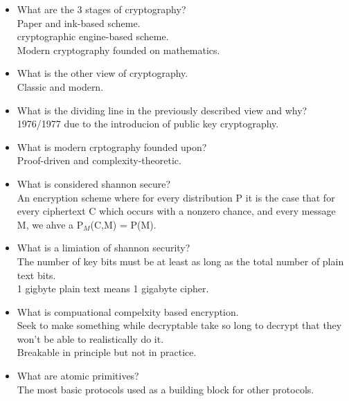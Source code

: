 \begin{itemize}
    \item What are the 3 stages of cryptography?\\
          Paper and ink-based scheme.\\
          cryptographic engine-based scheme.\\
          Modern cryptography founded on mathematics.\\

    \item What is the other view of cryptography.\\
          Classic and modern.\\

    \item What is the dividing line in the previously described view and why?\\
          1976/1977 due to the introducion of public key cryptography.\\

    \item What is modern crptography founded upon?\\
          Proof-driven and complexity-theoretic.\\

    \item What is considered shannon secure?\\
          An encryption scheme where for every distribution P it is the case that for every ciphertext C
          which occurs with a nonzero chance, and every message M, we ahve a P$_{M}$(C,M) = P(M).\\

    \item What is a limiation of shannon security?\\
          The number of key bits must be at least as long as the total number of plain text bits.\\
          1 gigbyte plain text means 1 gigabyte cipher.\\

    \item What is compuational compelxity based encryption.\\
          Seek to make something while decryptable take so long to decrypt that they won't be able to realistically do it.\\
          Breakable in principle but not in practice.\\

    \item What are atomic primitives?\\
          The most basic protocols used as a building block for other protocols.\\


\end{itemize}

